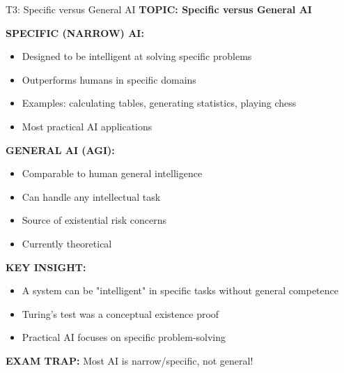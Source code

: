 \documentclass[8pt]{beamer}
\begin{document}
	\begin{frame}{T3: Specific versus General AI}
		\fontsize{6.5}{7.5}\selectfont
		\textbf{TOPIC: Specific versus General AI}
		
		\vspace{0.1cm}
		\textbf{SPECIFIC (NARROW) AI:}
		\begin{itemize}
			\item Designed to be intelligent at solving specific problems
			\item Outperforms humans in specific domains
			\item Examples: calculating tables, generating statistics, playing chess
			\item Most practical AI applications
		\end{itemize}
		
		\vspace{0.1cm}
		\textbf{GENERAL AI (AGI):}
		\begin{itemize}
			\item Comparable to human general intelligence
			\item Can handle any intellectual task
			\item Source of existential risk concerns
			\item Currently theoretical
		\end{itemize}
		
		\vspace{0.1cm}
		\textbf{KEY INSIGHT:}
		\begin{itemize}
			\item A system can be "intelligent" in specific tasks without general competence
			\item Turing's test was a conceptual existence proof
			\item Practical AI focuses on specific problem-solving
		\end{itemize}
		
		\textcolor{myred}{\textbf{EXAM TRAP:}} Most AI is \textcolor{myblue}{narrow/specific}, not general!
	\end{frame}
	
\end{document}
